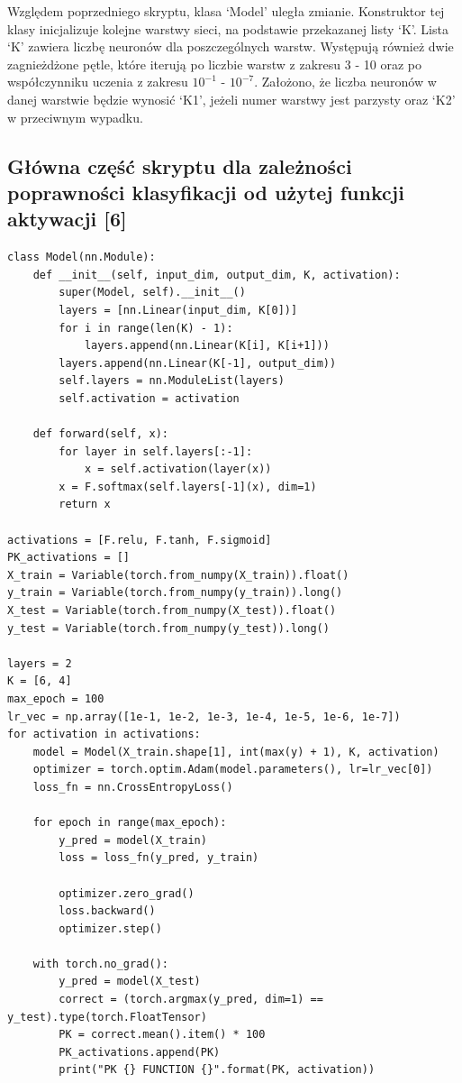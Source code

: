 \documentclass{article}
\begin{document}
\newpage
Względem poprzedniego skryptu, klasa `Model' uległa zmianie.
Konstruktor tej klasy inicjalizuje kolejne warstwy sieci, na podstawie przekazanej listy `K'.
Lista `K' zawiera liczbę neuronów dla poszczególnych warstw.
Występują również dwie zagnieżdżone pętle, które iterują po liczbie warstw z zakresu 3 - 10 oraz po współczynniku uczenia z zakresu $10^{-1}$ - $10^{-7}$.
Założono, że liczba neuronów w danej warstwie będzie wynosić `K1', jeżeli numer warstwy jest parzysty oraz `K2' w przeciwnym wypadku.

\subsection{Główna część skryptu dla zależności poprawności klasyfikacji od użytej funkcji aktywacji [6]}
\begin{verbatim}
class Model(nn.Module):
    def __init__(self, input_dim, output_dim, K, activation):
        super(Model, self).__init__()
        layers = [nn.Linear(input_dim, K[0])]
        for i in range(len(K) - 1):
            layers.append(nn.Linear(K[i], K[i+1]))
        layers.append(nn.Linear(K[-1], output_dim))
        self.layers = nn.ModuleList(layers)
        self.activation = activation

    def forward(self, x):
        for layer in self.layers[:-1]:
            x = self.activation(layer(x))
        x = F.softmax(self.layers[-1](x), dim=1)
        return x

activations = [F.relu, F.tanh, F.sigmoid]
PK_activations = []
X_train = Variable(torch.from_numpy(X_train)).float()
y_train = Variable(torch.from_numpy(y_train)).long()
X_test = Variable(torch.from_numpy(X_test)).float()
y_test = Variable(torch.from_numpy(y_test)).long()

layers = 2
K = [6, 4]
max_epoch = 100
lr_vec = np.array([1e-1, 1e-2, 1e-3, 1e-4, 1e-5, 1e-6, 1e-7])
for activation in activations:
    model = Model(X_train.shape[1], int(max(y) + 1), K, activation)
    optimizer = torch.optim.Adam(model.parameters(), lr=lr_vec[0])
    loss_fn = nn.CrossEntropyLoss()

    for epoch in range(max_epoch):
        y_pred = model(X_train)
        loss = loss_fn(y_pred, y_train)

        optimizer.zero_grad()
        loss.backward()
        optimizer.step()

    with torch.no_grad():
        y_pred = model(X_test)
        correct = (torch.argmax(y_pred, dim=1) == y_test).type(torch.FloatTensor)
        PK = correct.mean().item() * 100
        PK_activations.append(PK)
        print("PK {} FUNCTION {}".format(PK, activation))

\end{verbatim}
\end{document}
